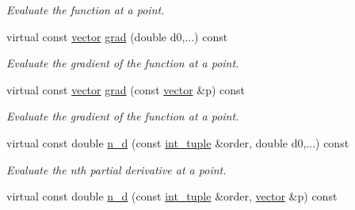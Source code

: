 \begin{DoxyCompactItemize}
\begin{DoxyCompactList}\small\item\em Evaluate the function at a point. \end{DoxyCompactList}\item 
\mbox{\label{classsisl_1_1test_1_1marschner__lobb_a23d7487d7fb21f04365c9c482519e781}} 
virtual const \hyperlink{namespacesisl_a2069bd5374a9be042ff3ce3306d41e1a}{vector} \hyperlink{classsisl_1_1test_1_1marschner__lobb_a23d7487d7fb21f04365c9c482519e781}{grad} (double d0,...) const
\begin{DoxyCompactList}\small\item\em Evaluate the gradient of the function at a point. \end{DoxyCompactList}\item 
\mbox{\label{classsisl_1_1test_1_1marschner__lobb_ac2465a99b86948283dbe82050f516095}} 
virtual const \hyperlink{namespacesisl_a2069bd5374a9be042ff3ce3306d41e1a}{vector} \hyperlink{classsisl_1_1test_1_1marschner__lobb_ac2465a99b86948283dbe82050f516095}{grad} (const \hyperlink{namespacesisl_a2069bd5374a9be042ff3ce3306d41e1a}{vector} \&p) const
\begin{DoxyCompactList}\small\item\em Evaluate the gradient of the function at a point. \end{DoxyCompactList}\item 
\mbox{\label{classsisl_1_1test_1_1marschner__lobb_a0c7654dca8b2c4d496cad1b843b23edd}} 
virtual const double \hyperlink{classsisl_1_1test_1_1marschner__lobb_a0c7654dca8b2c4d496cad1b843b23edd}{n\+\_\+d} (const \hyperlink{namespacesisl_adc492e1c166a136d08b283394d81cd71}{int\+\_\+tuple} \&order, double d0,...) const
\begin{DoxyCompactList}\small\item\em Evaluate the n\textquotesingle{}th partial derivative at a point. \end{DoxyCompactList}\item 
\mbox{\label{classsisl_1_1test_1_1marschner__lobb_aa0d1537a06ec9c5a6c5bf9148ca29b8e}} 
virtual const double \hyperlink{classsisl_1_1test_1_1marschner__lobb_aa0d1537a06ec9c5a6c5bf9148ca29b8e}{n\+\_\+d} (const \hyperlink{namespacesisl_adc492e1c166a136d08b283394d81cd71}{int\+\_\+tuple} \&order, \hyperlink{namespacesisl_a2069bd5374a9be042ff3ce3306d41e1a}{vector} \&p) const

\end{DoxyCompactItemize}
